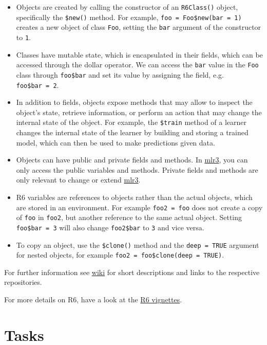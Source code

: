 \documentclass[]{scrbook}
\providecommand{\tightlist}{%
  \setlength{\itemsep}{0pt}\setlength{\parskip}{0pt}}
\begin{document}
\begin{itemize}
\tightlist
\item
  Objects are created by calling the constructor of an \texttt{R6Class()} object, specifically the \texttt{\$new()} method.
  For example, \texttt{foo\ =\ Foo\$new(bar\ =\ 1)} creates a new object of class \texttt{Foo}, setting the \texttt{bar} argument of the constructor to \texttt{1}.
\item
  Classes have mutable state, which is encapsulated in their fields, which can be accessed through the dollar operator.
  We can access the \texttt{bar} value in the \texttt{Foo} class through \texttt{foo\$bar} and set its value by assigning the field, e.g. \texttt{foo\$bar\ =\ 2}.
\item
  In addition to fields, objects expose methods that may allow to inspect the object's state, retrieve information, or perform an action that may change the internal state of the object.
  For example, the \texttt{\$train} method of a learner changes the internal state of the learner by building and storing a trained model, which can then be used to make predictions given data.
\item
  Objects can have public and private fields and methods.
  In \href{https://mlr3.mlr-org.com}{mlr3}, you can only access the public variables and methods.
  Private fields and methods are only relevant to change or extend \href{https://mlr3.mlr-org.com}{mlr3}.
\item
  R6 variables are references to objects rather than the actual objects, which are stored in an environment.
  For example \texttt{foo2\ =\ foo} does not create a copy of \texttt{foo} in \texttt{foo2}, but another reference to the same actual object.
  Setting \texttt{foo\$bar\ =\ 3} will also change \texttt{foo2\$bar} to \texttt{3} and vice versa.
\item
  To copy an object, use the \texttt{\$clone()} method and the \texttt{deep\ =\ TRUE} argument for nested objects, for example \texttt{foo2\ =\ foo\$clone(deep\ =\ TRUE)}.
\end{itemize}

For further information see \href{https://github.com/mlr-org/mlr3/wiki/Extension-Packages}{wiki} for short descriptions and links to the respective repositories.

For more details on R6, have a look at the \href{https://r6.r-lib.org/}{R6 vignettes}.

\hypertarget{tasks}{%
\section{Tasks}\label{tasks}}
\end{document}
